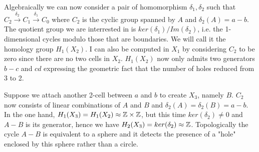\documentclass[12pt, a4paper]{article}
\begin{document}
Algebraically we can now consider a pair of homomorphism $\delta_1, \delta_2$ such that $C_2 \xrightarrow{\delta_2} C_1 \xrightarrow{\delta_1} C_0$ where $C_2$ is the cyclic group spanned by $A$ and $\delta_2(A) = a-b$. The quotient group we are interrested in is $ker(\delta_1)/Im(\delta_2)$, i.e. the 1-dimensional cycles modulo those that are boundaries. We will call it the homology group $H_1(X_2)$. I can also be computed in $X_1$ by considering $C_2$ to be zero since there are no two cells in $X_2$. $H_1(X_2)$ now only admits two generators $b-c$ and $cd$ expressing the geometric fact that the number of holes reduced from 3 to 2.\\


\begin{center}
\end{center}

Suppose we attach another 2-cell between $a$ and $b$ to create $X_3$, namely $B$. $C_2$ now consists of linear combinations of $A$ and $B$ and $\delta_2(A) = \delta_2(B) = a-b$. In the one hand, $H_1(X_3) = H_1(X_2) \approx \mathbb{Z} \times \mathbb{Z}$, but this time $ker(\delta_2) \neq 0$ and $A-B$ is its generator, hence we have $H_2(X_3) = ker(\delta_2) \approx \mathbb{Z}$. Topologically the cycle $A-B$ is equivalent to a sphere and it detects the presence of a "hole" enclosed by this sphere rather than a circle.\\
\end{document}

